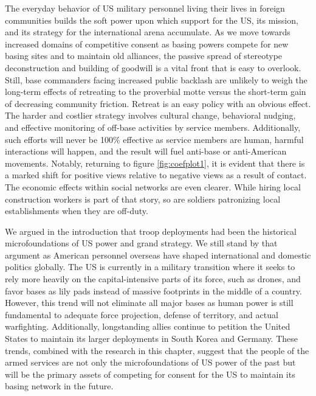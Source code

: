 The everyday behavior of US military personnel living their lives in foreign communities builds the soft power upon which support for the US, its mission, and its strategy for the international arena accumulate. As we move towards increased domains of competitive consent as basing powers compete for new basing sites and to maintain old alliances, the passive spread of stereotype deconstruction and building of goodwill is a vital front that is easy to overlook. Still, base commanders facing increased public backlash are unlikely to weigh the long-term effects of retreating to the proverbial motte versus the short-term gain of decreasing community friction. Retreat is an easy policy with an obvious effect. The harder and costlier strategy involves cultural change, behavioral nudging, and effective monitoring of off-base activities by service members. Additionally, such efforts will never be 100\% effective as service members are human, harmful interactions will happen, and the result will fuel anti-base or anti-American movements. Notably, returning to figure \ref{fig:coefplot1}, it is evident that there is a marked shift for positive views relative to negative views as a result of contact. The economic effects within social networks are even clearer. While hiring local construction workers is part of that story, so are soldiers patronizing local establishments when they are off-duty.

We argued in the introduction that troop deployments had been the historical microfoundations of US power and grand strategy. We still stand by that argument as American personnel overseas have shaped international and domestic politics globally. The US is currently in a military transition where it seeks to rely more heavily on the capital-intensive parts of its force, such as drones, and favor bases as lily pads instead of massive footprints in the middle of a country. However, this trend will not eliminate all major bases as human power is still fundamental to adequate force projection, defense of territory, and actual warfighting. Additionally, longstanding allies continue to petition the United States to maintain its larger deployments in South Korea and Germany. These trends, combined with the research in this chapter, suggest that the people of the armed services are not only the microfoundations of US power of the past but will be the primary assets of competing for consent for the US to maintain its basing network in the future.
